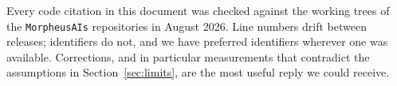 \documentclass[11pt,a4paper]{article}
\newcommand{\code}[1]{\texttt{\small #1}}
\begin{document}
\vspace{2ex}
\noindent
Every code citation in this document was checked against the working trees of
the \code{MorpheusAIs} repositories in August 2026. Line numbers drift between
releases; identifiers do not, and we have preferred identifiers wherever one was
available. Corrections, and in particular measurements that contradict the
assumptions in Section~\ref{sec:limits}, are the most useful reply we could
receive.

\vspace{1.5ex}
\end{document}
